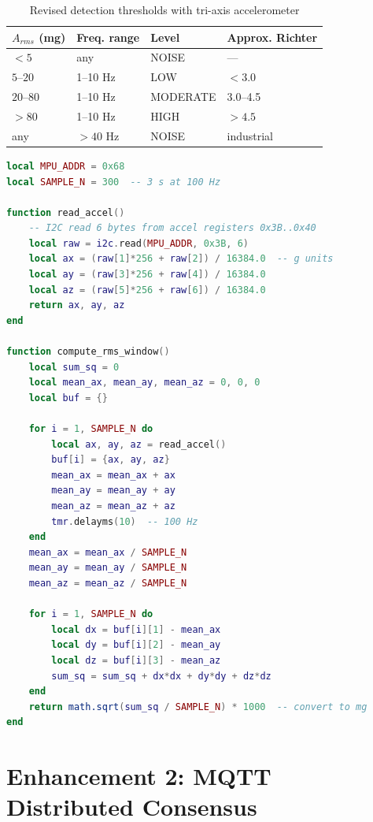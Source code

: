 \documentclass[11pt,a4paper]{article}
\begin{document}
\begin{table}[h!]
\centering
\begin{tabular}{llll}
\toprule
\textbf{$A_{rms}$ (mg)} & \textbf{Freq. range} & \textbf{Level} & \textbf{Approx. Richter} \\
\midrule
$< 5$ & any & NOISE & — \\
$5$--$20$ & 1--10 Hz & LOW & $< 3.0$ \\
$20$--$80$ & 1--10 Hz & MODERATE & 3.0--4.5 \\
$> 80$ & 1--10 Hz & HIGH & $> 4.5$ \\
any & $> 40$ Hz & NOISE & industrial \\
\bottomrule
\end{tabular}
\caption{Revised detection thresholds with tri-axis accelerometer}
\end{table}

\begin{lstlisting}[language=Lua, caption={MPU-6050 read and RMS computation (pseudocode)}]
local MPU_ADDR = 0x68
local SAMPLE_N = 300  -- 3 s at 100 Hz

function read_accel()
    -- I2C read 6 bytes from accel registers 0x3B..0x40
    local raw = i2c.read(MPU_ADDR, 0x3B, 6)
    local ax = (raw[1]*256 + raw[2]) / 16384.0  -- g units
    local ay = (raw[3]*256 + raw[4]) / 16384.0
    local az = (raw[5]*256 + raw[6]) / 16384.0
    return ax, ay, az
end

function compute_rms_window()
    local sum_sq = 0
    local mean_ax, mean_ay, mean_az = 0, 0, 0
    local buf = {}

    for i = 1, SAMPLE_N do
        local ax, ay, az = read_accel()
        buf[i] = {ax, ay, az}
        mean_ax = mean_ax + ax
        mean_ay = mean_ay + ay
        mean_az = mean_az + az
        tmr.delayms(10)  -- 100 Hz
    end
    mean_ax = mean_ax / SAMPLE_N
    mean_ay = mean_ay / SAMPLE_N
    mean_az = mean_az / SAMPLE_N

    for i = 1, SAMPLE_N do
        local dx = buf[i][1] - mean_ax
        local dy = buf[i][2] - mean_ay
        local dz = buf[i][3] - mean_az
        sum_sq = sum_sq + dx*dx + dy*dy + dz*dz
    end
    return math.sqrt(sum_sq / SAMPLE_N) * 1000  -- convert to mg
end
\end{lstlisting}

\section{Enhancement 2: MQTT Distributed Consensus}
\end{document}
